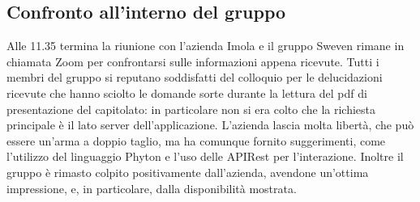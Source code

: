 \subsection{Confronto all'interno del gruppo}
Alle 11.35 termina la riunione con l'azienda Imola e il gruppo Sweven rimane in chiamata Zoom
per confrontarsi sulle informazioni appena ricevute. \newline
Tutti i membri del gruppo si reputano soddisfatti del colloquio per le delucidazioni ricevute 
che hanno sciolto le domande sorte durante la lettura del pdf di presentazione del capitolato:
in particolare non si era colto che la richiesta principale è il lato server dell'applicazione.
L'azienda lascia molta libertà, che può essere un'arma a doppio taglio, ma ha comunque 
fornito suggerimenti, come l'utilizzo del linguaggio Phyton e l'uso delle APIRest per l'interazione.
Inoltre il gruppo è rimasto colpito positivamente dall'azienda, avendone un'ottima impressione, e,
in particolare, dalla disponibilità mostrata.